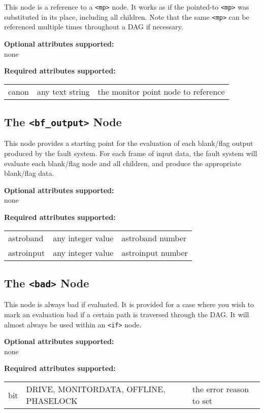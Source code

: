 \documentclass[letterpaper,12pt,oneside,pdftex]{article}
\newcommand{\optattrs}{\textbf{Optional attributes supported:}}
\newcommand{\reqattrs}{\textbf{Required attributes supported:}}
\begin{document}
This node is a reference to a \verb|<mp>| node. It works as if the pointed-to
\verb|<mp>| was substituted in its place, including all children. Note that the
same \verb|<mp>| can be referenced multiple times throughout a DAG if necessary.

\optattrs \\
none

\reqattrs \\
\begin{tabular}{lll}
canon       & any text string   & the monitor point node to reference \\
\end{tabular}

\subsection{The \texttt{<bf\_output>} Node}

This node provides a starting point for the evaluation of each blank/flag output
produced by the fault system. For each frame of input data, the fault system
will evaluate each blank/flag node and all children, and produce the appropriate
blank/flag data.

\optattrs \\
none

\reqattrs \\
\begin{tabular}{lll}
astroband   & any integer value & astroband number \\
astroinput  & any integer value & astroinput number \\
\end{tabular}

\subsection{The \texttt{<bad>} Node}

This node is always bad if evaluated. It is provided for a case where you wish
to mark an evaluation bad if a certain path is traversed through the DAG. It
will almost always be used within an \verb|<if>| node.

\optattrs \\
none

\reqattrs \\
\begin{tabular}{lll}
bit & DRIVE, MONITORDATA, OFFLINE, PHASELOCK & the error reason to set \\
\end{tabular}
\end{document}

